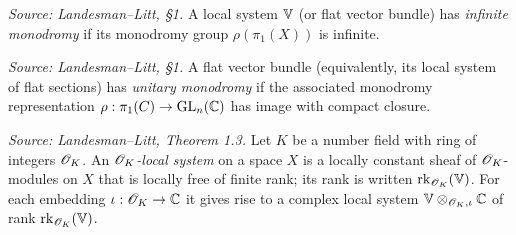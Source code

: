 \begin{definition}
  \label{def:infinite-monodromy}
  \textit{Source: Landesman--Litt, \S1.}
  A local system $\mathbb{V}$ (or flat vector bundle) has \emph{infinite monodromy} if
  its monodromy group $\rho(\pi_1(X))$ is infinite.
\end{definition}

\begin{definition}
  \label{def:unitary-monodromy}
  \textit{Source: Landesman--Litt, \S1.}
  A flat vector bundle (equivalently, its local system of flat sections) has
  \emph{unitary monodromy} if the associated monodromy representation
  $\rho : \pi_1(C) \to \operatorname{GL}_n(\mathbb{C})$ has image with compact closure.
\end{definition}

\begin{definition}
  \label{def:OK-local-system}
  \textit{Source: Landesman--Litt, Theorem 1.3.}
  Let $K$ be a number field with ring of integers $\mathscr{O}_K$. An \emph{$\mathscr{O}_K$-local
  system} on a space $X$ is a locally constant sheaf of $\mathscr{O}_K$-modules on $X$
  that is locally free of finite rank; its rank is written $\operatorname{rk}_{\mathscr{O}_K}(\mathbb{V})$.
  For each embedding $\iota : \mathscr{O}_K \to \mathbb{C}$ it gives rise to a complex local
  system $\mathbb{V} \otimes_{\mathscr{O}_K, \iota} \mathbb{C}$ of rank $\operatorname{rk}_{\mathscr{O}_K}(\mathbb{V})$.
\end{definition}

